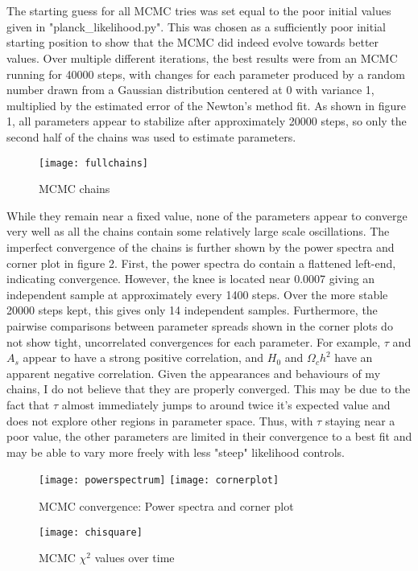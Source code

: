 \documentclass{article}
\newcommand{\<}[1]{\left\langle #1 \right\rangle }
\begin{document}
\section{}
The starting guess for all MCMC tries was set equal to the poor initial values given in "planck\_likelihood.py". This was chosen as a sufficiently poor initial starting position to show that the MCMC did indeed evolve towards better values. Over multiple different iterations, the best results were from an MCMC running for 40000 steps, with changes for each parameter produced by a random number drawn from a Gaussian distribution centered at 0 with variance 1, multiplied by the estimated error of the Newton's method fit. As shown in figure 1, all parameters appear to stabilize after approximately 20000 steps, so only the second half of the chains was used to estimate parameters. 
\begin{figure}[h]
	\caption{MCMC chains}
	\centering
	\texttt{[image: fullchains]}
\end{figure}
While they remain near a fixed value, none of the parameters appear to converge very well as all the chains contain some relatively large scale oscillations. The imperfect convergence of the chains is further shown by the power spectra and corner plot in figure 2. First, the power spectra do contain a flattened left-end, indicating convergence. However, the knee is located near 0.0007 giving an independent sample at approximately every 1400 steps. Over the more stable 20000 steps kept, this gives only 14 independent samples. Furthermore, the pairwise comparisons between parameter spreads shown in the corner plots do not show tight, uncorrelated convergences for each parameter. For example, $\tau$ and $A_s$ appear to have a strong positive correlation, and $H_0$ and $\Omega_c h^2$ have an apparent negative correlation. Given the appearances and behaviours of my chains, I do not believe that they are properly converged. This may be due to the fact that $\tau$ almost immediately jumps to around twice it's expected value and does not explore other regions in parameter space. Thus, with $\tau$ staying near a poor value, the other parameters are limited in their convergence to a best fit and may be able to vary more freely with less "steep" likelihood controls. 
\begin{figure}[h]
	\caption{MCMC convergence: Power spectra and corner plot}
	\centering
	\texttt{[image: powerspectrum]}
	\texttt{[image: cornerplot]}
\end{figure}
\begin{figure}[h]
	\caption{MCMC $\chi^2$ values over time}
	\centering
	\texttt{[image: chisquare]}
\end{figure}
\end{document}
